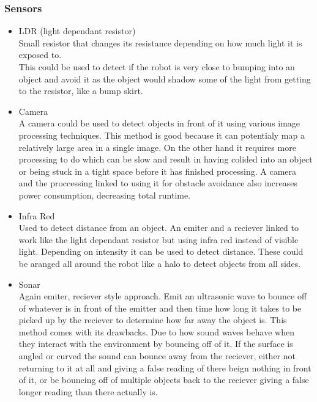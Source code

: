 \documentclass[11pt,fleqn,twoside]{article}
\begin{document}
\subsubsection{Sensors}
\begin{itemize}
\item LDR (light dependant resistor)
\\Small resistor that changes its resistance depending on how much light it is exposed to.
\\This could be used to detect if the robot is very close to bumping into an object and avoid it as the object would shadow some of the light from getting to the resistor, like a bump skirt.
\item Camera
\\A camera could be used to detect objects in front of it using various image processing techniques.  This method is good because it can potentialy map a relatively large area in a single image.  On the other hand it requires more processing to do which can be slow and result in having colided into an object or being stuck in a tight space before it has finished processing. A camera and the proccessing linked to using it for obstacle avoidance also increases power consumption, decreasing total runtime.
\item Infra Red
\\Used to detect distance from an object.  An emiter and a reciever linked to work like the light dependant resistor but using infra red instead of visible light.  Depending on intensity it can be used to detect distance.  These could be aranged all around the robot like a halo to detect objects from all sides.
\item Sonar
\\Again emiter, reciever style approach.  Emit an ultrasonic wave to bounce off of whatever is in  front of the emitter and then time how long it takes to be picked up by the reciever to determine how far away the object is.  This method comes with its drawbacks.  Due to how sound waves behave when they interact with the environment by bouncing off of it.  If the surface is angled or curved the sound can bounce away from the reciever, either not returning to it at all and giving a false reading of there beign nothing in front of it, or be bouncing off of multiple objects back to the reciever giving a false longer reading than there actually is.
\end{itemize}
\end{document}
